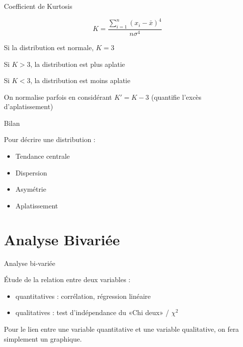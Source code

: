 \documentclass{beamer}
\begin{document}
\begin{frame}{Coefficient de Kurtosis}




$$ K=\frac{\sum_{i=1}^{n}(x_i -\bar{x})^4}{n\sigma^4}$$

Si la distribution est normale, $K= 3$

Si $K>3$, la distribution est \alert{plus aplatie} 

Si $K<3$, la distribution est \alert{moins aplatie} 

On normalise parfois en considérant $K'=K-3$ (quantifie l'excès d'aplatissement)


\end{frame}



\begin{frame}{Bilan}

Pour décrire une distribution : 

\begin{itemize}
\item Tendance centrale 
\item Dispersion
\item Asymétrie  
\item Aplatissement
\end{itemize}


\end{frame}


\section{Analyse Bivariée}

\begin{frame}{Analyse bi-variée}


Étude de  la relation entre \alert{deux} variables : 

\begin{itemize}
  \item quantitatives : \alert{corrélation, régression linéaire}
  \item qualitatives : test d'indépendance du \alert{«Chi deux» / $\chi^2$}
\end{itemize}

\vspace{2cm}

\begin{scriptsize}
\begin{spacing}{0.75}
Pour le lien entre une variable quantitative et une variable qualitative, on fera simplement un graphique.
\end{spacing}
\end{scriptsize}


\end{frame}
\end{document}
